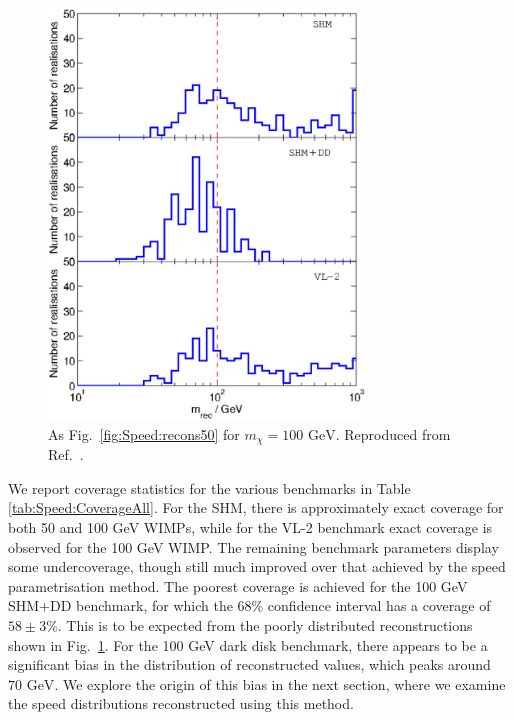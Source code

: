 \begin{figure}[t]
\centering
\includegraphics[width=0.75\textwidth]{Speed/100GeV-1.eps}
\caption[Distribution of reconstructed masses using the binned momentum distribution for a 100 GeV WIMP with SHM, SHM+DD and VL2 distribution functions]{As Fig.\ \ref{fig:Speed:recons50} for \(m_\chi = 100 \textrm{ GeV}\). Reproduced from Ref.~\cite{Kavanagh:2012}.}
  \label{fig:Speed:recons100}
\end{figure}


We report coverage statistics for the various benchmarks in Table \ref{tab:Speed:CoverageAll}. For the SHM, there is approximately exact coverage for both 50 and 100 GeV WIMPs, while for the VL-2 benchmark exact coverage is observed for the 100 GeV WIMP. The remaining benchmark parameters display some undercoverage, though still much improved over that achieved by the speed parametrisation method. The poorest coverage is achieved for the 100 GeV SHM+DD benchmark, for which the 68\% confidence interval has a coverage of \(58 \pm 3 \%\). This is to be expected from the poorly distributed reconstructions shown in Fig.\ \ref{fig:Speed:recons100}. For the 100 GeV dark disk benchmark, there appears to be a significant bias in the distribution of reconstructed values, which peaks around \(70 \textrm{ GeV}\). We explore the origin of this bias in the next section, where we examine the speed distributions reconstructed using this method.

